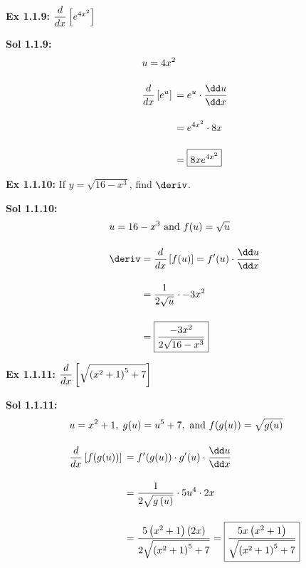 \begin{tcolorbox}[example]
    \textbf{Ex 1.1.9: } $\dfrac{d}{dx} \left[e^{4x^2}\right]$ 
\end{tcolorbox}
\begin{tcolorbox}[solution]
    \textbf{Sol 1.1.9: } \begin{align*}
        & u = 4x^2 \\[11pt]
        & \diff \left[e^u\right] \begin{aligned}[t]
            & = e^u \cdot \dfrac{\dd u}{\dd x} \\[11pt]
            & = e^{4x^2} \cdot 8x \\[11pt]
            & = \boxed{8xe^{4x^2}}
        \end{aligned}
    \end{align*}
\end{tcolorbox} \vspace{11pt}

\begin{tcolorbox}[example]
    \textbf{Ex 1.1.10: } If $y = \sqrt{16 - x^3}$, find $\deriv$. 
\end{tcolorbox}
\begin{tcolorbox}[solution]
    \textbf{Sol 1.1.10: } \begin{align*}
        & u = 16 - x^3 \text{ and } f(u) = \sqrt{u} \\[11pt]
        & \deriv \begin{aligned}[t]
            & = \diff \left[f(u)\right] = f'(u) \cdot \dfrac{\dd u}{\dd x} \\[11pt] 
            & = \dfrac{1}{2\sqrt{u}} \cdot -3x^2 \\[11pt]
            & = \boxed{\dfrac{-3x^2}{2\sqrt{16 - x^3}}}
        \end{aligned}
    \end{align*} 
\end{tcolorbox} \vspace{11pt}

\begin{tcolorbox}[example]
    \textbf{Ex 1.1.11: } $\dfrac{d}{dx} \left[\sqrt{\left(x^2 + 1\right)^5 + 7}\right]$
\end{tcolorbox}
\begin{tcolorbox}[solution]
    \textbf{Sol 1.1.11: }\begin{align*}
        & u = x^2 + 1, \; g(u) = u^5 + 7, \text{ and } f(g(u)) = \sqrt{g(u)} \\[11pt]
        & \diff \left[f(g(u))\right] \begin{aligned}[t]
            & = f'(g(u)) \cdot g'(u) \cdot \dfrac{\dd u}{\dd x} \\[11pt]
            & = \dfrac{1}{2\sqrt{g\left(u\right)}} \cdot 5u^4 \cdot 2x \\[11pt]
            & = \dfrac{5\left(x^2 + 1\right)(2x)}{2\sqrt{\left(x^2 + 1\right)^5 + 7}} = \boxed{\dfrac{5x\left(x^2 + 1\right)}{\sqrt{\left(x^2 + 1\right)^5 + 7}}}
        \end{aligned}
    \end{align*}
\end{tcolorbox}

